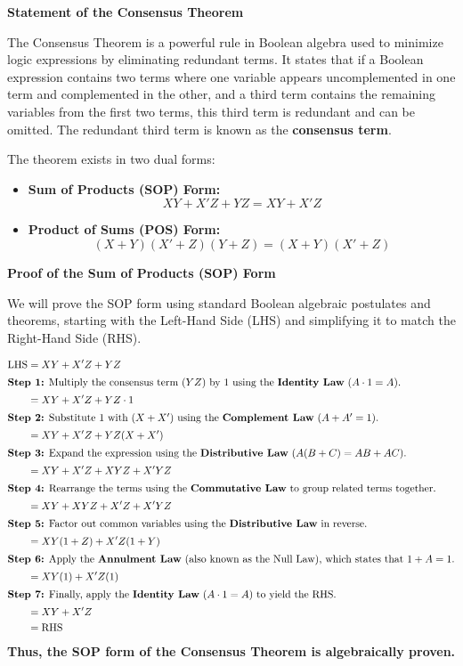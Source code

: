 \documentclass[12pt,a3paper]{article}
\begin{document}
\begin{enumerate}
\begin{tcolorbox}[enhanced,breakable,ansbox,colback=cA!4,colframe=cA,boxrule=0.8pt,arc=5pt,title={\textbf{Answer}},fonttitle=\bfseries\color{white},colbacktitle=cA]

\textbf{Statement of the Consensus Theorem}

The Consensus Theorem is a powerful rule in Boolean algebra used to minimize logic expressions by eliminating redundant terms. It states that if a Boolean expression contains two terms where one variable appears uncomplemented in one term and complemented in the other, and a third term contains the remaining variables from the first two terms, this third term is redundant and can be omitted. The redundant third term is known as the \textbf{consensus term}.

The theorem exists in two dual forms:
\begin{itemize}
    \item \textbf{Sum of Products (SOP) Form:} \[ XY + X'Z + YZ = XY + X'Z \]
    \item \textbf{Product of Sums (POS) Form:} \[ (X + Y)(X' + Z)(Y + Z) = (X + Y)(X' + Z) \]
\end{itemize}

\vspace{0.4cm}
\textbf{Proof of the Sum of Products (SOP) Form}

We will prove the SOP form using standard Boolean algebraic postulates and theorems, starting with the Left-Hand Side (LHS) and simplifying it to match the Right-Hand Side (RHS).

\begin{align*}
\text{LHS} &= XY + X'Z + YZ \\
\intertext{\textbf{Step 1:} Multiply the consensus term ($YZ$) by $1$ using the \textbf{Identity Law} ($A \cdot 1 = A$).}
&= XY + X'Z + YZ \cdot 1 \\
\intertext{\textbf{Step 2:} Substitute $1$ with $(X + X')$ using the \textbf{Complement Law} ($A + A' = 1$).}
&= XY + X'Z + YZ(X + X') \\
\intertext{\textbf{Step 3:} Expand the expression using the \textbf{Distributive Law} ($A(B + C) = AB + AC$).}
&= XY + X'Z + XYZ + X'YZ \\
\intertext{\textbf{Step 4:} Rearrange the terms using the \textbf{Commutative Law} to group related terms together.}
&= XY + XYZ + X'Z + X'YZ \\
\intertext{\textbf{Step 5:} Factor out common variables using the \textbf{Distributive Law} in reverse.}
&= XY(1 + Z) + X'Z(1 + Y) \\
\intertext{\textbf{Step 6:} Apply the \textbf{Annulment Law} (also known as the Null Law), which states that $1 + A = 1$.}
&= XY(1) + X'Z(1) \\
\intertext{\textbf{Step 7:} Finally, apply the \textbf{Identity Law} ($A \cdot 1 = A$) to yield the RHS.}
&= XY + X'Z \\
&= \text{RHS}
\end{align*}
\textbf{Thus, the SOP form of the Consensus Theorem is algebraically proven.}


\end{tcolorbox}
\end{enumerate}
\end{document}
